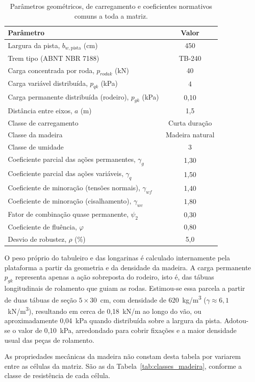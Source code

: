 \begin{table}[!ht]
\caption{Parâmetros geométricos, de carregamento e coeficientes normativos comuns a toda a matriz.\label{tab:parametros}}
\begin{threeparttable}
\begin{tabular*}{\columnwidth}{@{\extracolsep\fill}lc@{\extracolsep\fill}}
\toprule
Parâmetro & Valor \\
\midrule
Largura da pista, $b_{w,\mathrm{pista}}$ (cm) & 450 \\
Trem tipo (ABNT NBR 7188) & TB-240 \\
Carga concentrada por roda, $p_{rodak}$ (kN) & 40 \\
Carga variável distribuída, $p_{qk}$ (kPa) & 4 \\
Carga permanente distribuída (rodeiro), $p_{gk}$ (kPa)\tnote{a} & 0{,}10 \\
Distância entre eixos, $a$ (m) & 1{,}5 \\
Classe de carregamento & Curta duração \\
Classe da madeira & Madeira natural \\
Classe de umidade & 3 \\
Coeficiente parcial das ações permanentes, $\gamma_g$ & 1{,}30 \\
Coeficiente parcial das ações variáveis, $\gamma_q$ & 1{,}50 \\
Coeficiente de minoração (tensões normais), $\gamma_{wf}$ & 1{,}40 \\
Coeficiente de minoração (cisalhamento), $\gamma_{wc}$ & 1{,}80 \\
Fator de combinação quase permanente, $\psi_2$ & 0{,}30 \\
Coeficiente de fluência, $\varphi$ & 0{,}80 \\
Desvio de robustez, $\rho$ (\%) & 5{,}0 \\
\bottomrule
\end{tabular*}
\begin{tablenotes}
\footnotesize
\item[a] O peso próprio do tabuleiro e das longarinas é calculado internamente pela plataforma a partir da geometria e da densidade da madeira. A carga permanente $p_{gk}$ representa apenas a ação sobreposta do rodeiro, isto é, das tábuas longitudinais de rolamento que guiam as rodas.
Estimou-se essa parcela a partir de duas tábuas de seção $5 \times 30$~cm, com densidade de 620~kg/m\textsuperscript{3} ($\gamma \approx 6{,}1$~kN/m\textsuperscript{3}), resultando em cerca de 0{,}18~kN/m ao longo do vão, ou aproximadamente 0{,}04~kPa quando distribuída sobre a largura da pista.
Adotou-se o valor de 0{,}10~kPa, arredondado para cobrir fixações e a maior densidade usual das peças de rolamento.
\item As propriedades mecânicas da madeira não constam desta tabela por variarem entre as células da matriz. São as da Tabela~\ref{tab:classes_madeira}, conforme a classe de resistência de cada célula.
\end{tablenotes}
\end{threeparttable}
\end{table}

